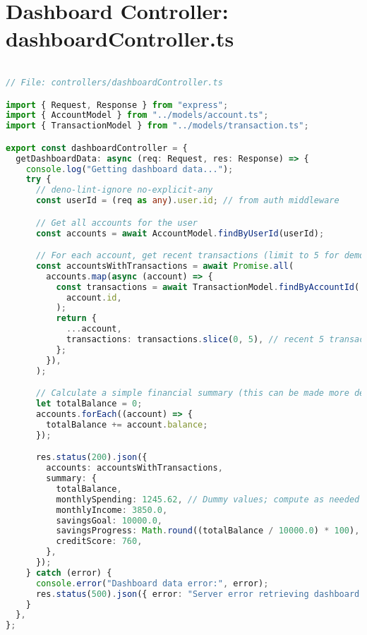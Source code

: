 \section{Dashboard Controller: dashboardController.ts}
\begin{lstlisting}[language=TypeScript]

// File: controllers/dashboardController.ts

import { Request, Response } from "express";
import { AccountModel } from "../models/account.ts";
import { TransactionModel } from "../models/transaction.ts";

export const dashboardController = {
  getDashboardData: async (req: Request, res: Response) => {
    console.log("Getting dashboard data...");
    try {
      // deno-lint-ignore no-explicit-any
      const userId = (req as any).user.id; // from auth middleware

      // Get all accounts for the user
      const accounts = await AccountModel.findByUserId(userId);

      // For each account, get recent transactions (limit to 5 for demonstration)
      const accountsWithTransactions = await Promise.all(
        accounts.map(async (account) => {
          const transactions = await TransactionModel.findByAccountId(
            account.id,
          );
          return {
            ...account,
            transactions: transactions.slice(0, 5), // recent 5 transactions
          };
        }),
      );

      // Calculate a simple financial summary (this can be made more detailed)
      let totalBalance = 0;
      accounts.forEach((account) => {
        totalBalance += account.balance;
      });

      res.status(200).json({
        accounts: accountsWithTransactions,
        summary: {
          totalBalance,
          monthlySpending: 1245.62, // Dummy values; compute as needed
          monthlyIncome: 3850.0,
          savingsGoal: 10000.0,
          savingsProgress: Math.round((totalBalance / 10000.0) * 100),
          creditScore: 760,
        },
      });
    } catch (error) {
      console.error("Dashboard data error:", error);
      res.status(500).json({ error: "Server error retrieving dashboard data" });
    }
  },
};

\end{lstlisting}

